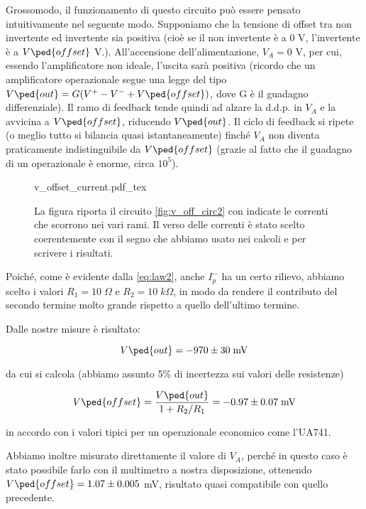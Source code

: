 Grossomodo, il funzionamento di questo circuito può essere pensato intuitivamente nel seguente modo.
Supponiamo che la tensione di offset tra non invertente ed invertente sia positiva (cioè se il non invertente è a 0 V, l'invertente è a $V\ped{offset}$ V.).
All'accensione dell'alimentazione,
$V_A = 0$ V, per cui, essendo l'amplificatore non ideale, l'uscita sarà positiva (ricordo che un amplificatore
operazionale segue una legge del tipo $V\ped{out} = G(V^+ - V^- + V\ped{offset})$, dove G è il guadagno differenziale).
Il ramo di feedback tende quindi ad alzare la d.d.p. in $V_A$ e la avvicina a $V\ped{offset}$, riducendo $V\ped{out}$.
Il ciclo di feedback si ripete (o meglio tutto si bilancia quasi istantaneamente) finché $V_A$ non diventa praticamente
indistinguibile da $V\ped{offset}$ (grazie al fatto che il guadagno di un operazionale è enorme, circa $10^5$).

\begin{figure}[t]
    \def\svgwidth{0.5\textwidth}
    {v_offset_current.pdf_tex}
    \caption{La figura riporta il circuito \ref{fig:v_off_circ2} con indicate le correnti che scorrono nei vari rami.
		Il verso delle correnti è stato scelto coerentemente con il segno che abbiamo usato nei calcoli e per scrivere i risultati.}
    \label{fig:circ_con_corr2}
\end{figure}

Poiché, come è evidente dalla \eqref{eq:law2}, anche $I_p^-$ ha un certo rilievo, abbiamo scelto i
valori $R_1 = 10 \; \Omega$ e $R_2 = 10 \; k\Omega$, in modo da rendere il contributo del secondo termine molto
grande rispetto a quello dell'ultimo termine.

Dalle nostre misure è risultato:

\begin{equation}
    V\ped{out} = - 970 \pm 30 \;\si{\milli\volt} 
\end{equation}

da cui si calcola (abbiamo assunto 5\% di incertezza sui valori delle resistenze)

\begin{equation}
    V\ped{offset} = \frac{V\ped{out}}{1 + R_2/R_1} = - 0.97 \pm 0.07 \; \si{\milli\volt}
\end{equation}

in accordo con i valori tipici per un operazionale economico come l'UA741.

Abbiamo inoltre misurato direttamente il valore di $V_A$, perché in questo caso è stato possibile
farlo con il multimetro a nostra disposizione, ottenendo $V\ped{offset} = 1.07 \pm 0.005$ mV, risultato
quasi compatibile con quello precedente.

